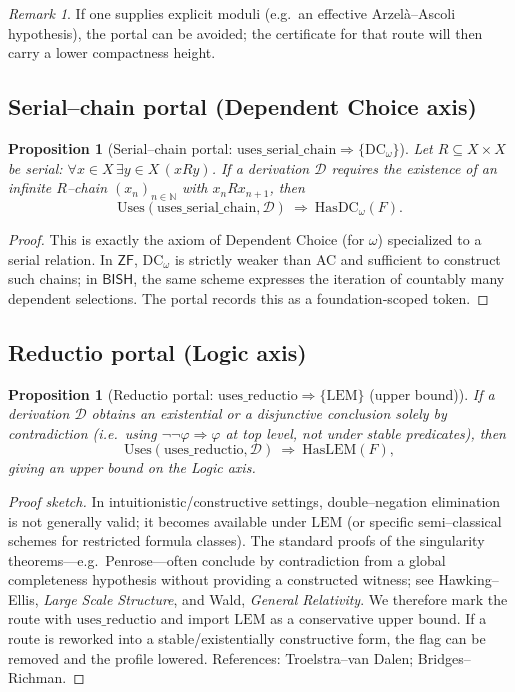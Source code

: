\documentclass[11pt]{article}
\newtheorem{proposition}[theorem]{Proposition}
\theoremstyle{definition}
\theoremstyle{remark}
\newtheorem{remark}[theorem]{Remark}
\newcommand{\BISH}{\mathsf{BISH}}
\newcommand{\ZF}{\mathsf{ZF}}
\newcommand{\LEM}{\mathrm{LEM}}
\newcommand{\DCw}{\mathrm{DC}_\omega}
\begin{document}
\begin{remark}
If one supplies explicit moduli (e.g.\ an effective Arzelà–Ascoli hypothesis), the portal can be avoided; the certificate for that route will then carry a lower compactness height.
\end{remark}

\subsection{Serial–chain portal (Dependent Choice axis)}

\begin{proposition}[Serial–chain portal: $\mathrm{uses\_serial\_chain}\Rightarrow\{\DCw\}$]
\label{prop:dc-portal}
Let $R\subseteq X\times X$ be serial: $\forall x\in X\,\exists y\in X\,(xRy)$. If a derivation $\mathcal{D}$ requires the existence of an infinite $R$–chain $(x_n)_{n\in\mathbb{N}}$ with $x_n R x_{n+1}$, then
\[
\mathrm{Uses}(\mathrm{uses\_serial\_chain},\mathcal{D})\ \Rightarrow\ \mathrm{HasDC}_\omega(F).
\]
\end{proposition}

\begin{proof}
This is exactly the axiom of Dependent Choice (for $\omega$) specialized to a serial relation. In $\ZF$, $\DCw$ is strictly weaker than AC and sufficient to construct such chains; in $\BISH$, the same scheme expresses the iteration of countably many dependent selections. The portal records this as a foundation‑scoped token. \qedhere
\end{proof}

\subsection{Reductio portal (Logic axis)}

\begin{proposition}[Reductio portal: $\mathrm{uses\_reductio}\Rightarrow\{\LEM\}$ (upper bound)]
\label{prop:reductio-portal}
If a derivation $\mathcal{D}$ obtains an \emph{existential} or a \emph{disjunctive} conclusion solely by contradiction (i.e.\ using $\neg\neg\varphi\Rightarrow\varphi$ at top level, not under stable predicates), then
\[
\mathrm{Uses}(\mathrm{uses\_reductio},\mathcal{D})\ \Rightarrow\ \mathrm{HasLEM}(F),
\]
giving an upper bound on the Logic axis.
\end{proposition}

\begin{proof}[Proof sketch]
In intuitionistic/constructive settings, double–negation elimination is not generally valid; it becomes available under $\LEM$ (or specific semi–classical schemes for restricted formula classes). The standard proofs of the singularity theorems—e.g.\ Penrose—often conclude by contradiction from a global completeness hypothesis without providing a constructed witness; see Hawking–Ellis, \emph{Large Scale Structure}, and Wald, \emph{General Relativity}. We therefore mark the route with $\mathrm{uses\_reductio}$ and import $\LEM$ as a conservative upper bound. If a route is reworked into a stable/existentially constructive form, the flag can be removed and the profile lowered. References: Troelstra–van Dalen; Bridges–Richman. \qedhere
\end{proof}
\end{document}
